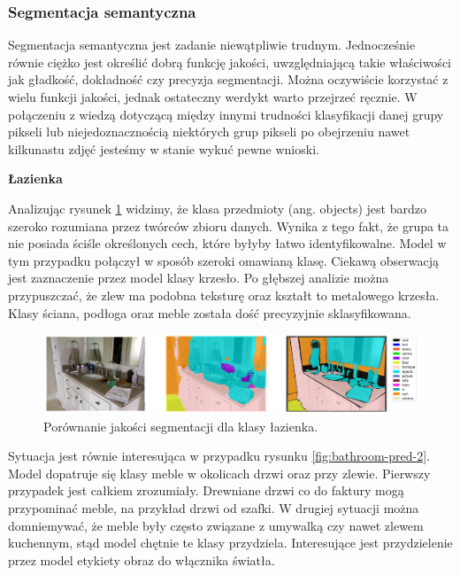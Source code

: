 \subsubsection{Segmentacja semantyczna}
Segmentacja semantyczna jest zadanie niewątpliwie trudnym. Jednocześnie równie ciężko jest określić dobrą funkcję jakości, uwzględniającą takie właściwości jak gładkość, dokładność czy precyzja segmentacji. Można oczywiście korzystać z wielu funkcji jakości, jednak ostateczny werdykt warto przejrzeć ręcznie. W połączeniu z wiedzą dotyczącą między innymi trudności klasyfikacji danej grupy pikseli lub niejedoznacznością niektórych grup pikseli po obejrzeniu nawet kilkunastu zdjęć jesteśmy w stanie wykuć pewne wnioski.

\noindent
\textbf{Łazienka}

Analizując rysunek \ref{fig:bathroom-pred-1} widzimy, że klasa przedmioty (ang. objects) jest bardzo szeroko rozumiana przez twórców zbioru danych. Wynika z tego fakt, że grupa ta nie posiada ściśle określonych cech, które byłyby łatwo identyfikowalne. Model w tym przypadku połączył w sposób szeroki omawianą klasę. Ciekawą obserwacją jest zaznaczenie przez model klasy krzesło. Po głębszej analizie można przypuszczać, że zlew ma podobna teksturę oraz kształt to metalowego krzesła. Klasy ściana, podłoga oraz meble została dość precyzyjnie sklasyfikowana.

\begin{figure}[ht!]
    \centering
    \includegraphics[width=\textwidth]{img/preds_analysis/gt_vs_pred/bathroom-1.png}
    \caption{Porównanie jakości segmentacji dla klasy łazienka.}
    \label{fig:bathroom-pred-1}
\end{figure}

Sytuacja jest równie interesująca w przypadku rysunku \ref{fig:bathroom-pred-2}. Model dopatruje się klasy meble w okolicach drzwi oraz przy zlewie. Pierwszy przypadek jest całkiem zrozumiały. Drewniane drzwi co do faktury mogą przypominać meble, na przykład drzwi od szafki. W drugiej sytuacji można domniemywać, że meble były często związane z umywalką czy nawet zlewem kuchennym, stąd model chętnie te klasy przydziela. Interesujące jest przydzielenie przez model etykiety obraz do włącznika światła.

